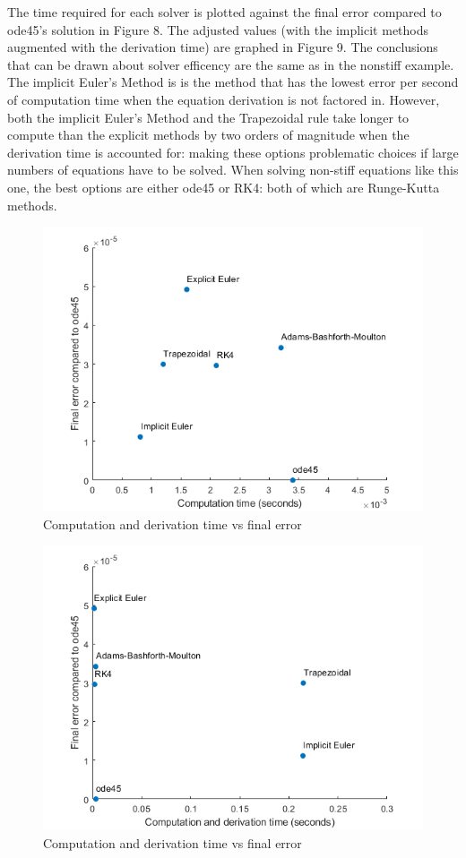\documentclass[11pt]{article}
\begin{document}
The time required for each solver is plotted against the final error compared to 
ode45's solution in Figure 8. The adjusted values (with the implicit methods 
augmented with the derivation time) are graphed in Figure 9. The conclusions that
can be drawn about solver efficency are the same as in the nonstiff example. 
The implicit Euler's Method is is the method 
that has the lowest error per second of computation time when the equation
derivation is not factored in. However, both the implicit Euler's Method and 
the Trapezoidal rule take longer to compute than the explicit methods by two orders
of magnitude when the derivation time is accounted for: making these options
problematic choices if large numbers of equations have to be solved. When solving
non-stiff equations like this one, the best options are either ode45 or RK4: both
of which are Runge-Kutta methods.

\begin{figure} [h]
\centering
        \includegraphics[totalheight=10cm]{error3.png}
    \caption{Computation and derivation time vs final error}
    \label{figure4}
\end{figure}

\begin{figure} [h]
\centering
        \includegraphics[totalheight=10cm]{error4.png}
    \caption{Computation and derivation time vs final error}
    \label{figure4}
\end{figure}
\end{document}
